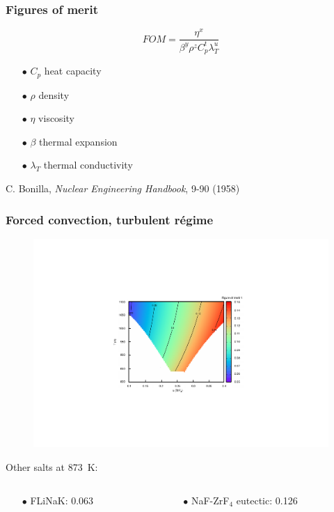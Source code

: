 \documentclass{beamer}
\begin{document}
\begin{frame}
   \frametitle{Figures of merit}
         \[
         FOM=\frac{\eta^x}{\beta^y\rho^z C_p^t \lambda_T^u}
         \]
      \begin{itemize}
      \item[$\bullet$] $C_p$ heat capacity
      \item[$\bullet$] $\rho$ density
      \item[$\bullet$] $\eta$ viscosity
      \item[$\bullet$]  $\beta$ thermal expansion
      \item[$\bullet$] $\lambda_T$ thermal conductivity
   \end{itemize}

\vspace{1cm}
{\scriptsize  C. Bonilla, {\it Nuclear Engineering Handbook}, 9-90 (1958)}
\end{frame}

\begin{frame}
   \frametitle{Forced convection, turbulent r\'egime}
   \begin{figure}
   \includegraphics[width=.6\textwidth]{merit1}
   \end{figure}

  Other salts at 873~K:
    \begin{columns}
      \begin{column}{6cm}
        \begin{itemize}
           \item[$\bullet$] FLiNaK: 0.063
        \end{itemize}
      \end{column}
      \begin{column}{6cm}
        \begin{itemize}
           \item[$\bullet$] NaF-ZrF$_4$ eutectic: 0.126
        \end{itemize}
      \end{column}
   \end{columns}
   
\end{frame}
\end{document}
